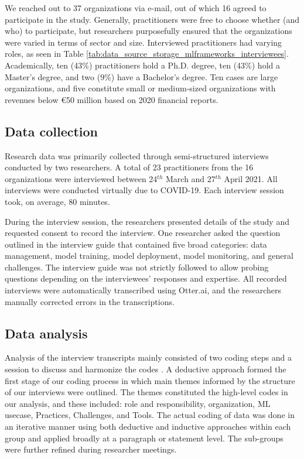 \documentclass{IEEEcsmag}
\begin{document}
We reached out to 37 organizations via e-mail, out of which 16 agreed to participate in the study. Generally, practitioners were free to choose whether (and who) to participate, but researchers purposefully ensured that the organizations were varied in terms of sector and size. Interviewed practitioners had varying roles, as seen in Table  \ref{tab:data_source_storage_mlframeworks_interviewees}. Academically, ten (43\%) practitioners hold a Ph.D. degree, ten (43\%) hold a Master's degree, and two (9\%) have a Bachelor's degree. Ten cases are large organizations, and five constitute small or medium-sized organizations with revenues below €50 million based on 2020 financial reports.


\subsection{Data collection}
Research data was primarily collected through semi-structured interviews conducted by two researchers. A total of 23 practitioners from the 16 organizations were interviewed between 24$^{th}$ March and 27$^{th}$ April 2021. All interviews were conducted virtually due to COVID-19. Each interview session took, on average, 80 minutes. 

During the interview session, the researchers presented details of the study and requested consent to record the interview. One researcher asked the question outlined in the interview guide that contained five broad categories: data management, model training, model deployment, model monitoring, and general challenges. The interview guide was not strictly followed to allow probing questions depending on the interviewees' responses and expertise. All recorded interviews were automatically transcribed using Otter.ai, and the researchers manually corrected errors in the transcriptions.  

 
\subsection{Data analysis}
Analysis of the interview transcripts mainly consisted of two coding steps and a session to discuss and harmonize the codes \cite{Runeson2008}. A deductive approach formed the first stage of our coding process in which main themes informed by the structure of our interviews were outlined. The themes constituted the high-level codes in our analysis, and these included: role and responsibility, organization, ML usecase, Practices, Challenges, and Tools. The actual coding of data was done in an iterative manner using both deductive and inductive \cite{Runeson2008} approaches within each group and applied broadly at a paragraph or statement level. The sub-groups were further refined during researcher meetings.
\end{document}
